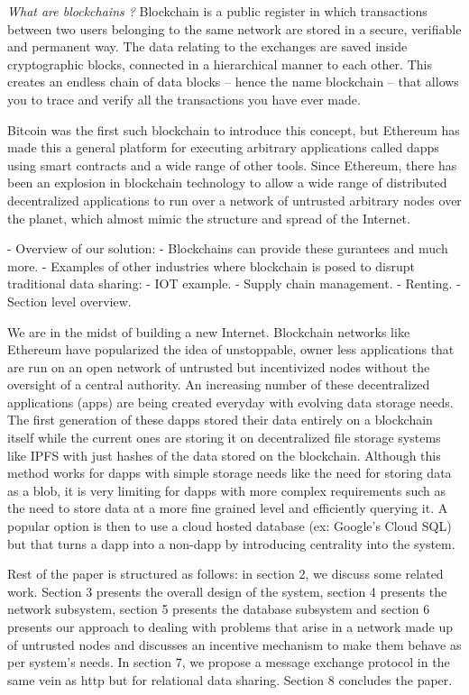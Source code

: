 {\em What are blockchains ?}
Blockchain is a public register in which transactions between two users belonging to the same network are stored in a secure, verifiable
and permanent way. The data relating to the exchanges are saved inside cryptographic blocks, connected in a hierarchical
manner to each other. This creates an endless chain of data blocks -- hence the name blockchain -- that allows you to
trace and verify all the transactions you have ever made.

Bitcoin was the first such blockchain to introduce this concept, but Ethereum has made this a general platform for
executing arbitrary applications called dapps using smart contracts and a wide range of other tools. Since Ethereum,
there has been an explosion in blockchain technology to allow a wide range of distributed decentralized applications to
run over a network of untrusted arbitrary nodes over the planet, which almost mimic the structure and spread of the
Internet.

- Overview of our solution:
  - Blockchains can provide these gurantees and much more. 
  - Examples of other industries where blockchain is posed to disrupt traditional data sharing:
    - IOT example.
    - Supply chain management.
    - Renting.
  - Section level overview.



We are in the midst of building a new Internet. Blockchain networks like Ethereum have popularized the idea of
unstoppable, owner less applications that are run on an open network of untrusted but incentivized nodes without the
oversight of a central authority. An increasing number of these decentralized applications (\DJ apps) are being created
everyday with evolving data storage needs. The first generation of these dapps stored their data entirely on a
blockchain itself while the current ones are storing it on decentralized file storage systems like IPFS with just hashes
of the data stored on the blockchain. Although this method works for dapps with simple storage needs like the need for
storing data as a blob, it is very limiting for dapps with more complex requirements such as the need to store data at a
more fine grained level and efficiently querying it. A popular option is then to use a cloud hosted database (ex:
Google’s Cloud SQL) but that turns a dapp into a non-dapp by introducing centrality into the system. \newline\newline

Rest of the paper is structured as follows: in section 2, we discuss some related work. Section 3 presents the overall design of the system, section 4 presents the network subsystem, section 5 presents the database subsystem and section 6 presents our approach to dealing with problems that arise in a network made up of untrusted nodes and discusses an incentive mechanism to make them behave as per system's needs. In section 7, we propose a message exchange protocol in the same vein as http but for relational data sharing. Section 8 concludes the paper.


